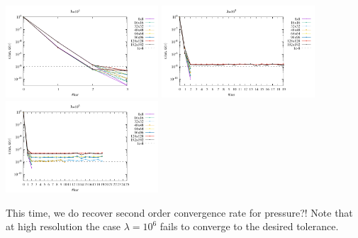 \begin{center}
\includegraphics[width=5.7cm]{python_codes/fieldstone_161/results/bench2/conv4.pdf}
\includegraphics[width=5.7cm]{python_codes/fieldstone_161/results/bench2/conv5.pdf}
\includegraphics[width=5.7cm]{python_codes/fieldstone_161/results/bench2/conv6.pdf}
\end{center}

This time, we do recover second order convergence rate for pressure?!
Note that at high resolution the case $\lambda=10^6$ fails to converge to the 
desired tolerance. 


